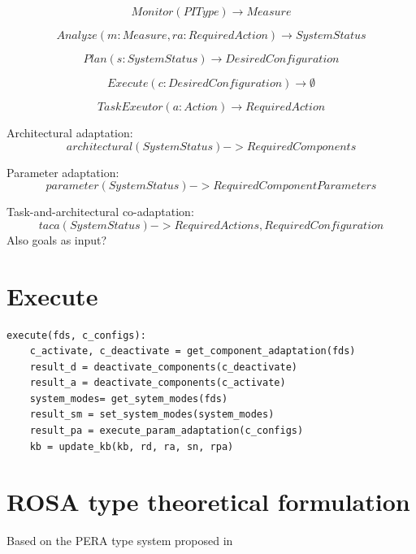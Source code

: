 \begin{equation}
    Monitor(PIType) \rightarrow Measure
\end{equation}

\begin{equation}
    Analyze(m: Measure, ra: RequiredAction) \rightarrow SystemStatus
\end{equation}

\begin{equation}
    Plan(s: SystemStatus) \rightarrow DesiredConfiguration
\end{equation}

\begin{equation}
    Execute(c: DesiredConfiguration) \rightarrow \emptyset
\end{equation}

\begin{equation}
    TaskExeutor(a: Action) \rightarrow RequiredAction
\end{equation}

Architectural adaptation:
\begin{equation}
    architectural(SystemStatus) -> RequiredComponents 
\end{equation}

Parameter adaptation:
\begin{equation}
    parameter(SystemStatus) -> RequiredComponentParameters 
\end{equation}

Task-and-architectural co-adaptation: 
\begin{equation}
    taca(SystemStatus) -> RequiredActions, RequiredConfiguration 
\end{equation}
Also goals as input?

\section{Execute}

\begin{lstlisting}
execute(fds, c_configs):
    c_activate, c_deactivate = get_component_adaptation(fds)
    result_d = deactivate_components(c_deactivate)
    result_a = deactivate_components(c_activate)
    system_modes= get_sytem_modes(fds)
    result_sm = set_system_modes(system_modes)
    result_pa = execute_param_adaptation(c_configs)
    kb = update_kb(kb, rd, ra, sn, rpa)
\end{lstlisting}

\section{ROSA type theoretical formulation}
Based on the PERA type system proposed in~\cite{}

